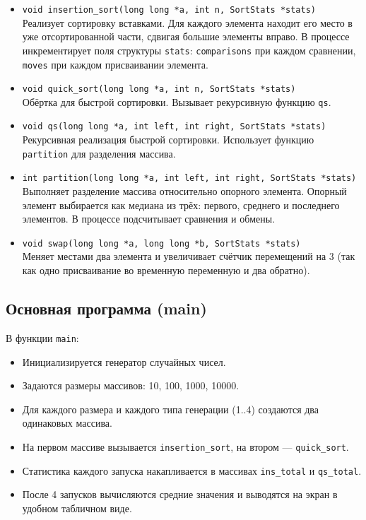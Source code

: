 \documentclass[a4paper,12pt,titlepage,finall]{article}
\begin{document}
\begin{itemize}
    \item \texttt{void insertion\_sort(long long *a, int n, SortStats *stats)} \\
        Реализует сортировку вставками. Для каждого элемента находит его место в уже отсортированной части, сдвигая большие элементы вправо. В процессе инкрементирует поля структуры \texttt{stats}: \texttt{comparisons} при каждом сравнении, \texttt{moves} при каждом присваивании элемента.
    \item \texttt{void quick\_sort(long long *a, int n, SortStats *stats)} \\
        Обёртка для быстрой сортировки. Вызывает рекурсивную функцию \texttt{qs}.
    \item \texttt{void qs(long long *a, int left, int right, SortStats *stats)} \\
        Рекурсивная реализация быстрой сортировки. Использует функцию \texttt{partition} для разделения массива.
    \item \texttt{int partition(long long *a, int left, int right, SortStats *stats)} \\
        Выполняет разделение массива относительно опорного элемента. Опорный элемент выбирается как медиана из трёх: первого, среднего и последнего элементов. В процессе подсчитывает сравнения и обмены.
    \item \texttt{void swap(long long *a, long long *b, SortStats *stats)} \\
        Меняет местами два элемента и увеличивает счётчик перемещений на 3 (так как одно присваивание во временную переменную и два обратно).
\end{itemize}

\subsection{Основная программа (main)}

В функции \texttt{main}:
\begin{itemize}
    \item Инициализируется генератор случайных чисел.
    \item Задаются размеры массивов: 10, 100, 1000, 10000.
    \item Для каждого размера и каждого типа генерации (1..4) создаются два одинаковых массива.
    \item На первом массиве вызывается \texttt{insertion\_sort}, на втором — \texttt{quick\_sort}.
    \item Статистика каждого запуска накапливается в массивах \texttt{ins\_total} и \texttt{qs\_total}.
    \item После 4 запусков вычисляются средние значения и выводятся на экран в удобном табличном виде.
\end{itemize}
\end{document}
